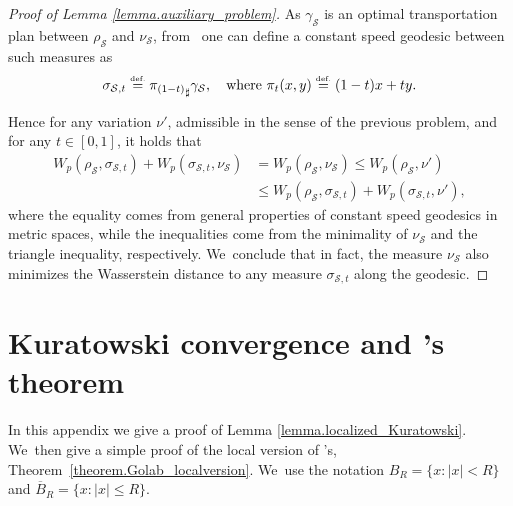 \documentclass[JEP,XML,SOM,Unicode,NoFloatCountersInSection,published]{cedram}
\theoremstyle{definition}
\newcommand{\eqdef}{\ensuremath{\stackrel{\mbox{\upshape\tiny def.}}{=}}}
\newcommand{\oB}{\overline{B}}
\begin{document}
\begin{proof}[Proof of Lemma \ref{lemma.auxiliary_problem}]
As $\gamma_{\mathcal{S}}$ is an optimal transportation plan between $\rho_{\mathcal{S}}$ and $\nu_{\mathcal{S}}$, from~\cite[Th.\,5.27]{santambrogio2015optimal} one can define a constant speed geodesic between such measures as
\begin{equation*}
\sigma_{\mathcal{S},t} \eqdef {\pi_{(1-t)}}_\sharp\gamma_{\mathcal{S}}, \quad\text{where } \pi_t(x,y) \eqdef (1-t)x + ty.
\end{equation*}

Hence for any variation $\nu'$, admissible in the sense of the previous problem, and for any $t \in [0,1]$, it holds that
\begin{align*}
W_p\left(\rho_{\mathcal{S}}, \sigma_{\mathcal{S},t}\right) + W_p\left(\sigma_{\mathcal{S},t}, \nu_{\mathcal{S}}\right)
&=
W_p\left(\rho_{\mathcal{S}}, \nu_{\mathcal{S}}\right)
\le W_p\left(\rho_{\mathcal{S}}, \nu'\right)\\
&\le W_p\left(\rho_{\mathcal{S}}, \sigma_{\mathcal{S},t}\right) + W_p(\sigma_{\mathcal{S},t}, \nu'),
\end{align*}
where the equality comes from general properties of constant speed geodesics in metric spaces, while the inequalities come from the minimality of $\nu_{\mathcal{S}}$ and the triangle inequality, respectively. We~conclude that in fact, the measure $\nu_{\mathcal{S}}$ also minimizes the Wasserstein distance to any measure $\sigma_{\mathcal{S},t}$ along the geodesic.
\end{proof}

\section{Kuratowski convergence and \Golab's theorem}\label{appendix.kuratowski_convergence}
In this appendix we give a proof of Lemma \ref{lemma.localized_Kuratowski}. We~then give a simple proof
of the local version of \Golab's, Theorem~\ref{theorem.Golab_localversion}. We~use the notation $B_R=\{x: |x|<R\}$ and $\oB_R = \{x:|x|\le R\}$.
\end{document}
